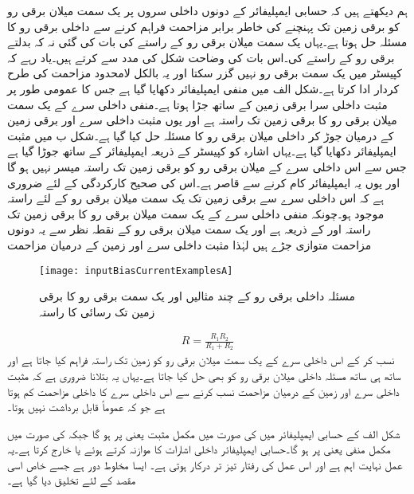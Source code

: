 ہم دیکھتے ہیں کہ حسابی ایمپلیفائر کے دونوں داخلی سروں پر یک سمت میلان برقی رو کو برقی زمین تک پہنچنے کی خاطر برابر مزاحمت فراہم کرنے سے داخلی برقی رو کا مسئلہ حل ہوتا ہے۔یہاں یک سمت میلان برقی رو کے راستے کی بات کی گئی نہ کہ بدلتے برقی رو کے راستے کی۔اس بات کی وضاحت شکل     کی مدد سے کرتے ہیں۔یاد رہے کہ کپیسٹر میں یک سمت برقی رو نہیں گزر سکتا اور یہ بالکل لامحدود مزاحمت کی طرح کردار ادا کرتا ہے۔شکل   الف میں منفی ایمپلیفائر دکھایا گیا ہے جس کا عمومی طور پر مثبت داخلی سرا برقی زمین کے ساتھ جڑا ہوتا ہے۔منفی داخلی سرے  کے یک سمت میلان  برقی رو کا برقی زمین تک راستہ  ہے اور یوں مثبت داخلی سرے  اور برقی زمین کے درمیان  جوڑ کر داخلی میلان برقی رو کا مسئلہ حل کیا گیا ہے۔شکل  ب میں مثبت ایمپلیفائر دکھایا گیا ہے۔یہاں اشارہ کو کپیسٹر کے ذریعہ ایمپلیفائر کے ساتھ جوڑا گیا ہے جس سے اس داخلی سرے  کے میلان برقی رو کو برقی زمین تک راستہ میسر نہیں ہو گا اور یوں یہ ایمپلیفائر کام کرنے سے قاصر ہے۔اس کی صحیح کارکردگی کے لئے ضروری ہے کہ اس داخلی سرے  سے برقی زمین تک یک سمت میلان برقی رو کے لئے راستہ موجود ہو۔چونکہ منفی  داخلی سرے  کے یک سمت میلان برقی رو کا برقی زمین تک راستہ  اور  کے ذریعہ ہے اور یک سمت میلان برقی رو کے نقطہ نظر سے یہ دونوں مزاحمت متوازی جڑے ہیں لہٰذا مثبت  داخلی سرے  اور زمین کے درمیان مزاحمت
\begin{figure}
\centering
\texttt{[image: inputBiasCurrentExamplesA]}
\caption{مسئلہ داخلی برقی رو کے چند مثالیں اور یک سمت برقی رو کا برقی زمین تک رسائی کا راستہ}
\label{شکل_مسئلہ_داخلی_برقی_رو_کے_چند_مثال}
\end{figure}
%
\begin{align*}
R=\frac{R_1 R_2}{R_1+R_2}
\end{align*}
نسب کر کے اس داخلی سرے  کے یک سمت میلان برقی رو کو زمین تک راستہ فراہم کیا جاتا ہے اور ساتھ ہی ساتھ مسئلہ داخلی میلان برقی رو کو بھی حل کیا جاتا ہے۔یہاں یہ بتلانا ضروری ہے کہ مثبت داخلی سرے  اور زمین کے درمیان مزاحمت  نسب کرنے سے اس داخلی سرے  کا داخلی مزاحمت کم ہوتا ہے جو کہ عموماً قابل برداشت نہیں ہوتا۔



شکل  الف کے حسابی ایمپلیفائر میں  کی صورت میں  مکمل مثبت یعنی  پر ہو گا جبکہ  کی صورت میں  مکمل منفی یعنی  پر ہو گا۔حسابی ایمپلیفائر داخلی اشارات کا موازنہ کرتے ہوئے  یا   خارج کرتا ہے۔یہ عمل نہایت اہم ہے اور اس عمل کی رفتار تیز تر درکار ہوتی ہے۔ ایسا مخلوط دور ہے جسے خاص اسی مقصد کے لئے تخلیق دیا گیا ہے۔


